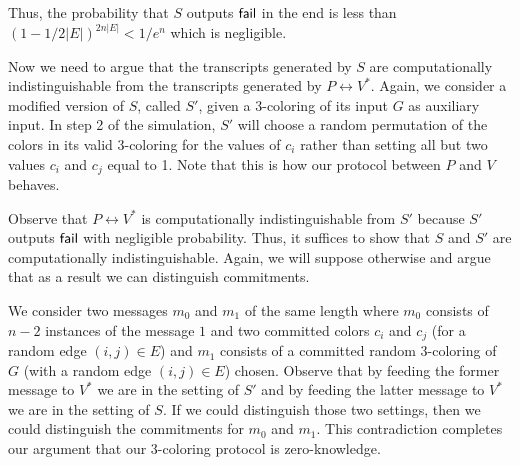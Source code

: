 Thus, the probability that $S$ outputs $\sf{fail}$ in the end is less than $(1 - 1/2|E|)^{2n|E|} < 1/e^n$ which is negligible.

Now we need to argue that the transcripts generated by $S$ are computationally indistinguishable from the transcripts generated by $P \leftrightarrow V^*$. Again, we consider a modified version of $S$, called $S'$, given a 3-coloring of its input $G$ as auxiliary input. In step 2 of the simulation, $S'$ will choose a random permutation of the colors in its valid 3-coloring for the values of $c_i$ rather than setting all but two values $c_i$ and $c_j$ equal to 1. Note that this is how our protocol between $P$ and $V$ behaves.

Observe that $P \leftrightarrow V^*$ is computationally indistinguishable from $S'$ because $S'$ outputs $\sf{fail}$ with negligible probability. Thus, it suffices to show that $S$ and $S'$ are computationally indistinguishable. Again, we will suppose otherwise and argue that as a result we can distinguish commitments.

We consider two messages $m_0$ and $m_1$ of the same length where $m_0$ consists of $n-2$ instances of the message $1$ and two committed colors $c_i$ and $c_j$ (for a random edge $(i, j) \in E$) and $m_1$ consists of a committed random 3-coloring of $G$ (with a random edge $(i, j) \in E$) chosen. Observe that by feeding the former message to $V^*$ we are in the setting of $S'$ and by feeding the latter message to $V^*$ we are in the setting of $S$. If we could distinguish those two settings, then we could distinguish the commitments for $m_0$ and $m_1$. This contradiction completes our argument that our 3-coloring protocol is zero-knowledge.















